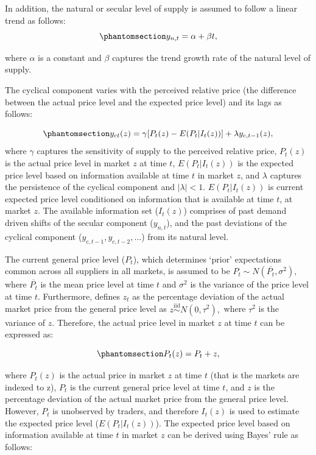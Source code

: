 \documentclass[
  letterpaper,
  DIV=11,
  numbers=noendperiod]{scrartcl}
\begin{document}
In addition, the natural or secular level of supply is assumed to follow
a linear trend as follows:
\begin{equation}\phantomsection\label{eq-natural_supply}{ y_{n,t} = \alpha + \beta t, }\end{equation}

where \(\alpha\) is a constant and \(\beta\) captures the trend growth
rate of the natural level of supply.

The cyclical component varies with the perceived relative price (the
difference between the actual price level and the expected price level)
and its lags as follows:

\begin{equation}\phantomsection\label{eq-cyclical_component}{ y_{ct}(z) = \gamma[P_t(z) - E(P_t | I_t(z))] + \lambda y_{c, t-1}(z), }\end{equation}
where \(\gamma\) captures the sensitivity of supply to the perceived
relative price, \(P_t(z)\) is the actual price level in market \(z\) at
time \(t\), \(E(P_t | I_t(z))\) is the expected price level based on
information available at time \(t\) in market \(z\), and \(\lambda\)
captures the persistence of the cyclical component and
\(|\lambda| < 1\). \(E(P_t | I_t(z))\) is current expected price level
conditioned on information that is available at time \(t\), at market
\(z\). The available information set (\(I_t(z)\)) comprises of past
demand driven shifts of the secular component (\(y_{n,t}\)), and the
past deviations of the cyclical component
(\(y_{c, t-1}, y_{c, t-2}, ...\)) from its natural level.

The current general price level (\(P_t\)), which determines `prior'
expectations common across all suppliers in all markets, is assumed to
be \(P_t \sim N(\overline{P_t}, \sigma^2),\) where \(\overline{P_t}\) is
the mean price level at time \(t\) and \(\sigma^2\) is the variance of
the price level at time \(t\). Furthermore, \citet{lucas1973} defines
\(z_t\) as the percentage deviation of the actual market price from the
general price level as \(z\overset{\text{iid}}{\sim} N(0, \tau^2),\)
where \(\tau^2\) is the variance of \(z\). Therefore, the actual price
level in market \(z\) at time \(t\) can be expressed as:

\begin{equation}\phantomsection\label{eq-price_decomposition}{P_t(z) = P_t + z, }\end{equation}

where \(P_t(z)\) is the actual price in market \(z\) at time \(t\) (that
is the markets are indexed to z), \(P_t\) is the current general price
level at time \(t\), and \(z\) is the percentage deviation of the actual
market price from the general price level. However, \(P_t\) is
unobserved by traders, and therefore \(I_t(z)\) is used to estimate the
expected price level (\(E(P_t| I_t(z))\)). The expected price level
based on information available at time \(t\) in market \(z\) can be
derived using Bayes' rule as follows:
\end{document}
